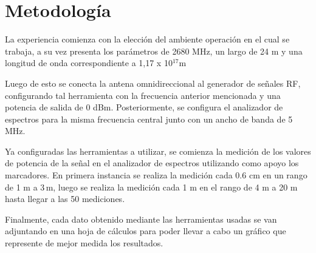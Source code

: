 \section{Metodología}\label{sec:metodologia}

La experiencia comienza con la elección del ambiente operación en el cual se trabaja, a su vez presenta  los parámetros de 2680 MHz, un largo de 24 m y una longitud de onda correspondiente a 1,17 x 10$^{17}$m

Luego de esto se conecta la antena omnidireccional al generador de señales RF, configurando tal herramienta con la frecuencia anterior mencionada y una potencia de salida de 0 dBm. Posteriormente, se configura el analizador de espectros para la misma frecuencia central junto con un ancho de banda de 5 MHz.

Ya configuradas las herramientas a utilizar, se comienza la medición de los valores de potencia de la señal en el analizador de espectros utilizando como apoyo los marcadores. En primera instancia se realiza la medición cada 0.6 cm en un rango de 1 m a 3 m, luego se realiza la medición cada 1 m en el rango de 4 m a 20 m hasta llegar a las 50 mediciones.


Finalmente, cada dato obtenido mediante las herramientas usadas se van adjuntando en una hoja de cálculos para poder llevar a cabo un gráfico que represente de mejor medida los resultados.